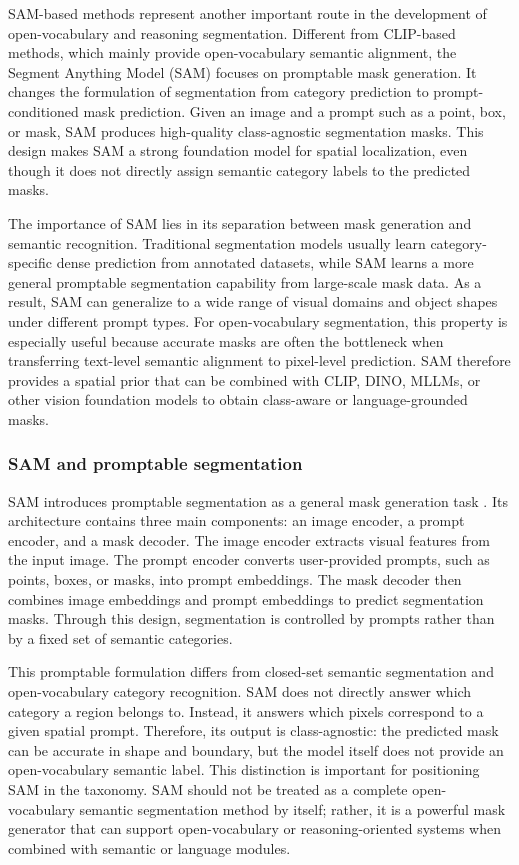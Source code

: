 SAM-based methods represent another important route in the development of open-vocabulary and reasoning segmentation. 
Different from CLIP-based methods, which mainly provide open-vocabulary semantic alignment, the Segment Anything Model (SAM) focuses on promptable mask generation. 
It changes the formulation of segmentation from category prediction to prompt-conditioned mask prediction. 
Given an image and a prompt such as a point, box, or mask, SAM produces high-quality class-agnostic segmentation masks. 
This design makes SAM a strong foundation model for spatial localization, even though it does not directly assign semantic category labels to the predicted masks.

The importance of SAM lies in its separation between mask generation and semantic recognition. 
Traditional segmentation models usually learn category-specific dense prediction from annotated datasets, while SAM learns a more general promptable segmentation capability from large-scale mask data. 
As a result, SAM can generalize to a wide range of visual domains and object shapes under different prompt types. 
For open-vocabulary segmentation, this property is especially useful because accurate masks are often the bottleneck when transferring text-level semantic alignment to pixel-level prediction. 
SAM therefore provides a spatial prior that can be combined with CLIP, DINO, MLLMs, or other vision foundation models to obtain class-aware or language-grounded masks.

\subsubsection{SAM and promptable segmentation}

SAM introduces promptable segmentation as a general mask generation task \cite{Kirillov2023}. 
Its architecture contains three main components: an image encoder, a prompt encoder, and a mask decoder. 
The image encoder extracts visual features from the input image. 
The prompt encoder converts user-provided prompts, such as points, boxes, or masks, into prompt embeddings. 
The mask decoder then combines image embeddings and prompt embeddings to predict segmentation masks. 
Through this design, segmentation is controlled by prompts rather than by a fixed set of semantic categories.

This promptable formulation differs from closed-set semantic segmentation and open-vocabulary category recognition. 
SAM does not directly answer which category a region belongs to. 
Instead, it answers which pixels correspond to a given spatial prompt. 
Therefore, its output is class-agnostic: the predicted mask can be accurate in shape and boundary, but the model itself does not provide an open-vocabulary semantic label. 
This distinction is important for positioning SAM in the taxonomy. 
SAM should not be treated as a complete open-vocabulary semantic segmentation method by itself; rather, it is a powerful mask generator that can support open-vocabulary or reasoning-oriented systems when combined with semantic or language modules.

